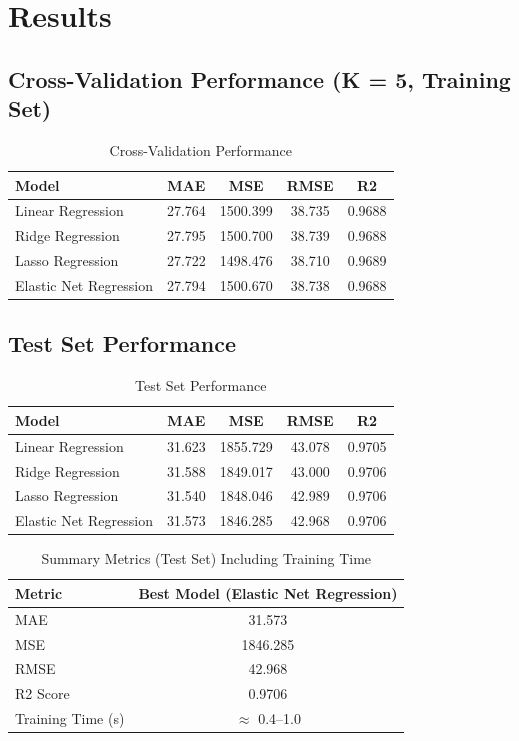 \documentclass[12pt,a4paper]{article}
\begin{document}
\section{Results}

\subsection*{Cross-Validation Performance (K = 5, Training Set)}
\begin{table}[H]
\centering
\caption{Cross-Validation Performance}
\begin{tabular}{lcccc}
\toprule
Model & MAE & MSE & RMSE & R2 \\
\midrule
Linear Regression & 27.764 & 1500.399 & 38.735 & 0.9688 \\
Ridge Regression & 27.795 & 1500.700 & 38.739 & 0.9688 \\
Lasso Regression & 27.722 & 1498.476 & 38.710 & 0.9689 \\
Elastic Net Regression & 27.794 & 1500.670 & 38.738 & 0.9688 \\
\bottomrule
\end{tabular}
\end{table}

\subsection*{Test Set Performance}
\begin{table}[H]
\centering
\caption{Test Set Performance}
\begin{tabular}{lcccc}
\toprule
Model & MAE & MSE & RMSE & R2 \\
\midrule
Linear Regression & 31.623 & 1855.729 & 43.078 & 0.9705 \\
Ridge Regression & 31.588 & 1849.017 & 43.000 & 0.9706 \\
Lasso Regression & 31.540 & 1848.046 & 42.989 & 0.9706 \\
Elastic Net Regression & 31.573 & 1846.285 & 42.968 & 0.9706 \\
\bottomrule
\end{tabular}
\end{table}

\begin{table}[H]
\centering
\caption{Summary Metrics (Test Set) Including Training Time}
\begin{tabular}{lc}
\toprule
Metric & Best Model (Elastic Net Regression) \\
\midrule
MAE & 31.573 \\
MSE & 1846.285 \\
RMSE & 42.968 \\
R2 Score & 0.9706 \\
Training Time (s) & $\approx$ 0.4--1.0 \\
\bottomrule
\end{tabular}
\end{table}
\end{document}

